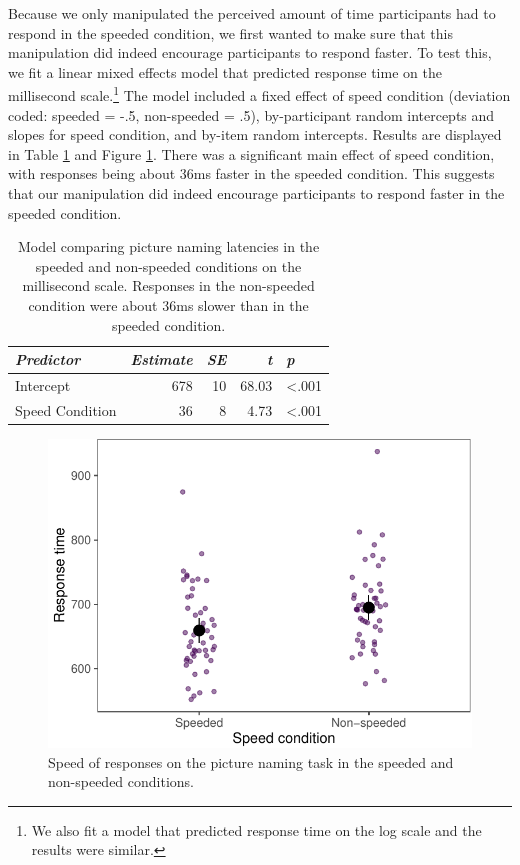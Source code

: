 \documentclass[
  man,floatsintext]{apa6}
\begin{document}
Because we only manipulated the perceived amount of time participants had to respond in the speeded condition, we first wanted to make sure that this manipulation did indeed encourage participants to respond faster. To test this, we fit a linear mixed effects model that predicted response time on the millisecond scale.\footnote{We also fit a model that predicted response time on the log scale and the results were similar.} The model included a fixed effect of speed condition (deviation coded: speeded = -.5, non-speeded = .5), by-participant random intercepts and slopes for speed condition, and by-item random intercepts. Results are displayed in Table \ref{tab:exp2speed} and Figure \ref{fig:exp2speedfig}. There was a significant main effect of speed condition, with responses being about 36ms faster in the speeded condition. This suggests that our manipulation did indeed encourage participants to respond faster in the speeded condition.

\begin{table}

\caption{\label{tab:exp2speed}Model comparing picture naming latencies in the speeded and non-speeded conditions on the millisecond scale. Responses in the non-speeded condition were about 36ms slower than in the speeded condition.}
\centering
\begin{tabular}[t]{lrrrl}
\toprule
\em{Predictor} & \em{Estimate} & \em{SE} & \em{t} & \em{p}\\
\midrule
Intercept & 678 & 10 & 68.03 & <.001\\
Speed Condition & 36 & 8 & 4.73 & <.001\\
\bottomrule
\end{tabular}
\end{table}



\begin{figure}
\centering
\includegraphics{task_difficulty_ind_dif_files/figure-latex/exp2speedfig-1.pdf}
\caption{\label{fig:exp2speedfig}Speed of responses on the picture naming task in the speeded and non-speeded conditions.}
\end{figure}
\end{document}
